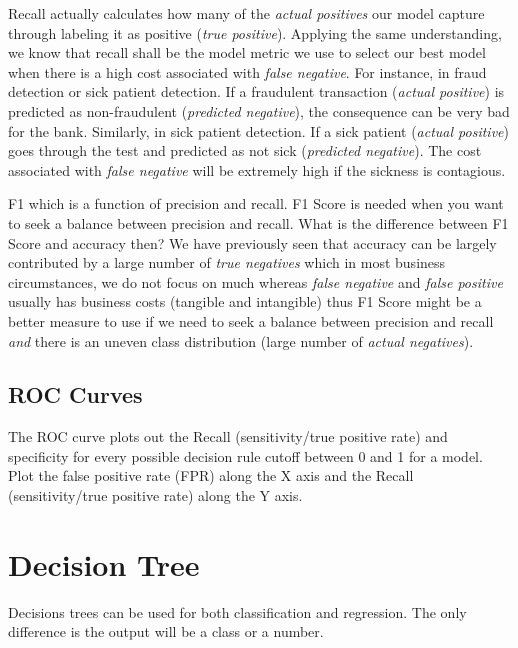 Recall actually calculates how many of the \emph{actual positives} our model capture through labeling it as positive (\emph{true positive}). Applying the same understanding, we know that recall shall be the model metric we use to select our best model when there is a high cost associated with \emph{false negative}.  For instance, in fraud detection or sick patient detection. If a fraudulent transaction (\emph{actual positive}) is predicted as non-fraudulent (\emph{predicted negative}), the consequence can be very bad for the bank.  Similarly, in sick patient detection. If a sick patient (\emph{actual positive}) goes through the test and predicted as not sick (\emph{predicted negative}). The cost associated with \emph{false negative} will be extremely high if the sickness is contagious.

F1 which is a function of precision and recall.  F1 Score is needed when you want to seek a balance between precision and recall. What is the difference between F1 Score and accuracy then?  We have previously seen that accuracy can be largely contributed by a large number of \emph{true negatives} which in most business circumstances, we do not focus on much whereas \emph{false negative} and \emph{false positive} usually has business costs (tangible and intangible) thus F1 Score might be a better measure to use if we need to seek a balance between precision and recall \emph{and} there is an uneven class distribution (large number of \emph{actual negatives}).


	\subsection{ROC Curves}
The ROC curve plots out the Recall (sensitivity/true positive rate) and specificity for every possible decision rule cutoff between 0 and 1 for a model.
Plot the false positive rate (FPR) along the X axis and the Recall (sensitivity/true positive rate) along the Y axis.

	\section{Decision Tree}
Decisions trees can be used for both classification and regression.  The only difference is the output will be a class or a number.

